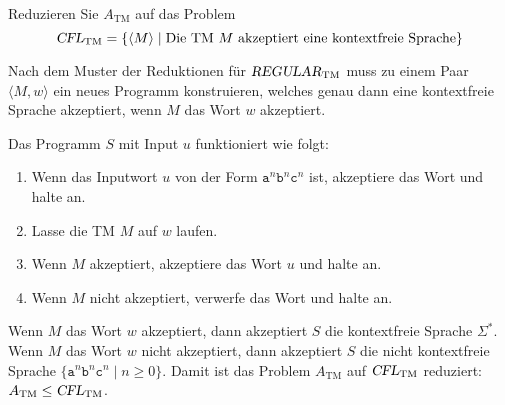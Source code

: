 Reduzieren Sie $A_{\text{TM}}$ auf das Problem
\[
\textsl{CFL}_{\text{TM}}
=
\{
\langle M\rangle
\mid
\text{Die TM $M$ akzeptiert eine kontextfreie Sprache}
\}
\]

\begin{loesung}
Nach dem Muster der Reduktionen für $\textsl{REGULAR}_{\text{TM}}$
muss zu einem Paar $\langle M,w\rangle$ ein neues Programm konstruieren,
welches genau dann eine kontextfreie Sprache akzeptiert, wenn 
$M$ das Wort $w$ akzeptiert.

Das Programm $S$ mit Input $u$ funktioniert wie folgt:
\begin{enumerate}
\item
Wenn das Inputwort $u$ von der Form
$\texttt{a}^n\texttt{b}^n\texttt{c}^n$
ist, akzeptiere das Wort und halte an.
\item 
Lasse die TM $M$ auf $w$ laufen.
\item
Wenn $M$ akzeptiert, akzeptiere das Wort $u$ und halte an.
\item
Wenn $M$ nicht akzeptiert, verwerfe das Wort und halte an.
\end{enumerate}
Wenn $M$ das Wort $w$ akzeptiert, dann akzeptiert $S$ die
kontextfreie Sprache $\Sigma^*$.
Wenn $M$ das Wort $w$ nicht akzeptiert, dann akzeptiert $S$ die
nicht kontextfreie Sprache $\{\texttt{a}^n\texttt{b}^n\texttt{c}^n \mid n\ge 0\}$.
Damit ist das Problem $A_{\text{TM}}$ auf $\textsl{CFL}_{\text{TM}}$
reduziert: $A_{\text{TM}}\le \textsl{CFL}_{\text{TM}}$.
\end{loesung}
